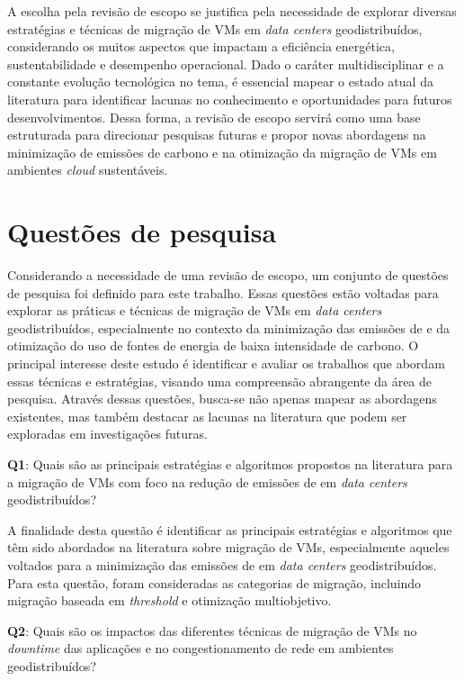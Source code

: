 \documentclass[
	12pt,				%
	oneside,			%
	a4paper,			%
	english,			%
	brazil				%
	]{abntex2ppgsi}
\begin{document}
\begin{apendicesenv}
A escolha pela revisão de escopo se justifica pela necessidade de explorar diversas estratégias e técnicas de migração de VMs em \textit{data centers} geodistribuídos, considerando os muitos aspectos que impactam a eficiência energética, sustentabilidade e desempenho operacional. Dado o caráter multidisciplinar e a constante evolução tecnológica no tema, é essencial mapear o estado atual da literatura para identificar lacunas no conhecimento e oportunidades para futuros desenvolvimentos. Dessa forma, a revisão de escopo servirá como uma base estruturada para direcionar pesquisas futuras e propor novas abordagens na minimização de emissões de carbono e na otimização da migração de VMs em ambientes \textit{cloud} sustentáveis.

\section{Questões de pesquisa}\label{section:questoes-de-pesquisa}
Considerando a necessidade de uma revisão de escopo, um conjunto de questões de pesquisa foi definido para este trabalho. Essas questões estão voltadas para explorar as práticas e técnicas de migração de VMs em \textit{data centers} geodistribuídos, especialmente no contexto da minimização das emissões de  e da otimização do uso de fontes de energia de baixa intensidade de carbono. O principal interesse deste estudo é identificar e avaliar os trabalhos que abordam essas técnicas e estratégias, visando uma compreensão abrangente da área de pesquisa. Através dessas questões, busca-se não apenas mapear as abordagens existentes, mas também destacar as lacunas na literatura que podem ser exploradas em investigações futuras.

\textbf{Q1}: Quais são as principais estratégias e algoritmos propostos na literatura para a migração de VMs com foco na redução de emissões de  em \textit{data centers} geodistribuídos?

A finalidade desta questão é identificar as principais estratégias e algoritmos que têm sido abordados na literatura sobre migração de VMs, especialmente aqueles voltados para a minimização das emissões de  em \textit{data centers} geodistribuídos. Para esta questão, foram consideradas as categorias de migração, incluindo migração baseada em \textit{threshold} e otimização multiobjetivo.

\textbf{Q2}: Quais são os impactos das diferentes técnicas de migração de VMs no \textit{downtime} das aplicações e no congestionamento de rede em ambientes geodistribuídos?


\end{apendicesenv}
\end{document}
